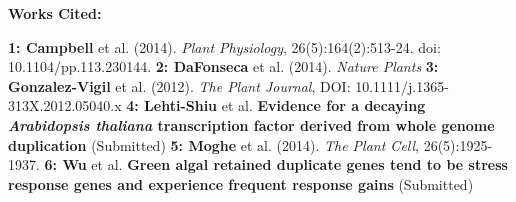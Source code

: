 \documentclass[12pt]{amsart}
\begin{document}
\small{
\hfill\break\textbf{Works Cited: }\hfill

\textbf{1: Campbell} et al. (2014). \textit{Plant Physiology}, 26(5):164(2):513-24. doi: 10.1104/pp.113.230144.
\textbf{2: DaFonseca} et al. (2014). \textit{Nature Plants}
\textbf{3: Gonzalez-Vigil} et al. (2012). \textit{The Plant Journal}, DOI: 10.1111/j.1365-313X.2012.05040.x 
\textbf{4: Lehti-Shiu} et al. \textbf{Evidence for a decaying \textit{Arabidopsis thaliana} transcription factor derived from whole genome duplication} (Submitted)
\textbf{5: Moghe} et al. (2014). \textit{The Plant Cell}, 26(5):1925-1937.
\textbf{6: Wu} et al. \textbf{Green algal retained duplicate genes tend to be stress response genes and experience frequent response gains} (Submitted)
}
\end{document}
